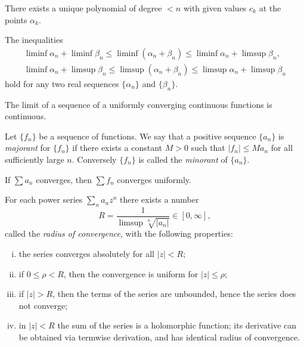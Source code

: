 \begin{corollary}
  There exists a unique polynomial of degree $< n$ with given values $c_k$ at the points $\alpha_k$.
\end{corollary}

The inequalities
\begin{gather*}
  \liminf \alpha_n + \liminf \beta_n \leq \liminf (\alpha_n + \beta_n) \leq \liminf \alpha_n + \limsup \beta_n, \\
  \liminf \alpha_n + \limsup \beta_n \leq \limsup (\alpha_n + \beta_n) \leq \limsup \alpha_n + \limsup \beta_n
\end{gather*}
hold for any two real sequences $\{\alpha_n\}$ and $\{\beta_n\}$.

\begin{proposition}
  The limit of a sequence of a uniformly converging continuous functions is continuous.
\end{proposition}

\begin{definition}
  Let $\{f_n\}$ be a sequence of functions. We say that a positive sequence $\{a_n\}$ is \emph{majorant} for $\{f_n\}$ if there exists a constant $M > 0$ such that $|f_n| \leq M a_n$ for all sufficiently large $n$. Conversely $\{f_n\}$ is called the \emph{minorant} of $\{a_n\}$.
\end{definition}

\begin{proposition}
  If $\sum a_n$ converges, then $\sum f_n$ converges uniformly.
\end{proposition}

\begin{theorem}
  For each power series $\sum_n a_n z^n$ there exists a number
  \[
  R = \frac{1}{\limsup \sqrt[n]{|a_n|}}\in [0,\infty],
  \]
  called the \emph{radius of convergence}, with the following properties:
  \begin{enumerate}[(i)]
  \item the series converges absolutely for all $|z| < R$;
  \item if $0 \leq \rho < R$, then the convergence is uniform for $|z| \leq \rho$;
  \item if $|z| > R$, then the terms of the series are unbounded, hence the series does not converge;
  \item in $|z| < R$ the sum of the series is a holomorphic function; its derivative can be obtained via termwise derivation, and has identical radius of convergence.
  \end{enumerate}
\end{theorem}

